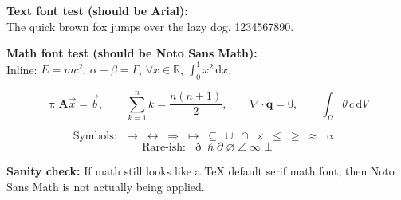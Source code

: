 \documentclass{article}
\begin{document}

\noindent
\textbf{Text font test (should be Arial):}\\
The quick brown fox jumps over the lazy dog. 1234567890.

\vspace{1em}
\noindent
\textbf{Math font test (should be Noto Sans Math):}\\
Inline: $E = mc^2$, $\alpha+\beta=\Gamma$, $\forall x\in\mathbb{R}$, $\int_0^1 x^2\,\mathrm{d}x$.

\[
\uppi\mathbf{A}\vec{x}=\vec{b},\qquad
\sum_{k=1}^n k = \frac{n(n+1)}{2},\qquad
\nabla\cdot \mathbf{q} = 0,\qquad
\int_\Omega \theta\,c\,\mathrm{d}V
\]

\[
\text{Symbols: }\;
\rightarrow\;\leftrightarrow\;\Rightarrow\;\mapsto\;
\subseteq\;\cup\;\cap\;\times\;
\leqslant\;\geqslant\;\approx\;\propto\;
\]
\[
\text{Rare-ish: }\;
\eth\;\hbar\;\partial\;\varnothing\;\angle\;\infty\;\bot
\]

\vspace{1em}
\noindent
\textbf{Sanity check:}\;
If math still looks like a TeX default serif math font, then Noto Sans Math
is not actually being applied.
\end{document}
